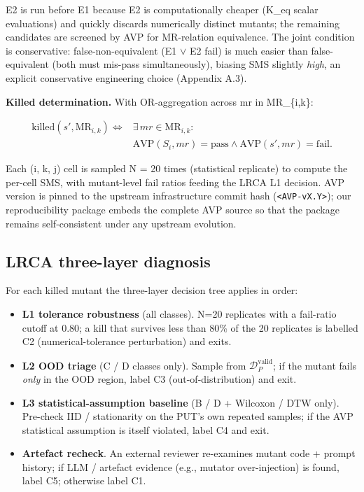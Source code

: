 \documentclass[manuscript,screen,review]{acmart}
\begin{document}
E2 is run before E1 because E2 is computationally cheaper (K\_eq scalar
evaluations) and quickly discards numerically distinct mutants; the
remaining candidates are screened by AVP for MR-relation equivalence.
The joint condition is conservative: false-non-equivalent (E1 $\vee$ E2 fail)
is much easier than false-equivalent (both must mis-pass
simultaneously), biasing SMS slightly \emph{high}, an explicit
conservative engineering choice (Appendix A.3).

\textbf{Killed determination.} With OR-aggregation across mr in
MR\_\{i,k\}:

\[
\begin{aligned}
\mathrm{killed}(s', \mathrm{MR}_{i,k}) \iff{} & \exists\,mr \in \mathrm{MR}_{i,k}: \\
& \mathrm{AVP}(S_i, mr) = \text{pass} \wedge
  \mathrm{AVP}(s', mr) = \text{fail}.
\end{aligned}
\]

Each (i, k, j) cell is sampled N = 20 times (statistical replicate) to
compute the per-cell SMS, with mutant-level fail ratios feeding the LRCA
L1 decision. AVP version is pinned to the upstream infrastructure commit hash
(\texttt{\textless{}AVP-vX.Y\textgreater{}}); our reproducibility
package embeds the complete AVP source so that the package remains
self-consistent under any upstream evolution.

\subsection{LRCA three-layer diagnosis}\label{lrca-three-layer-diagnosis}

For each killed mutant the three-layer decision tree applies in order:

\begin{itemize}

\item
  \textbf{L1 tolerance robustness} (all classes). N=20 replicates with a
  fail-ratio cutoff at 0.80; a kill that survives less than 80\% of the
  20 replicates is labelled C2 (numerical-tolerance perturbation) and
  exits.
\item
  \textbf{L2 OOD triage} (C / D classes only). Sample from
  $\mathcal{D}_P^{\mathrm{valid}}$; if the mutant fails \emph{only} in the OOD
  region, label C3 (out-of-distribution) and exit.
\item
  \textbf{L3 statistical-assumption baseline} (B / D + Wilcoxon / DTW
  only). Pre-check IID / stationarity on the PUT's own repeated samples;
  if the AVP statistical assumption is itself violated, label C4 and
  exit.
\item
  \textbf{Artefact recheck}. An external reviewer re-examines mutant
  code + prompt history; if LLM / artefact evidence (e.g., mutator
  over-injection) is found, label C5; otherwise label C1.
\end{itemize}
\end{document}
